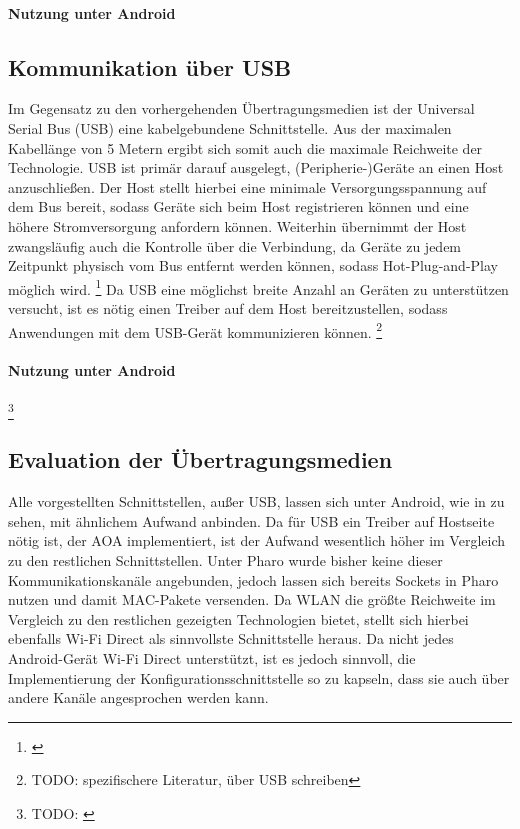         \paragraph{Nutzung unter Android}

    \subsection{Kommunikation über USB}
        Im Gegensatz zu den vorhergehenden Übertragungsmedien ist der Universal Serial Bus (USB) eine kabelgebundene Schnittstelle. Aus der maximalen Kabellänge von 5 Metern
        ergibt sich somit auch die maximale Reichweite der Technologie. USB ist primär darauf ausgelegt, (Peripherie-)Geräte an einen Host anzuschließen.
        Der Host stellt hierbei eine minimale Versorgungsspannung auf dem Bus bereit, sodass Geräte sich beim Host registrieren können und eine höhere Stromversorgung anfordern können.
        Weiterhin übernimmt der Host zwangsläufig auch die Kontrolle über die Verbindung, da Geräte zu jedem Zeitpunkt physisch vom Bus entfernt werden können, sodass Hot-Plug-and-Play
        möglich wird. \footnote{\cite[S.21-24]{Kelm}}
        Da USB eine möglichst breite Anzahl an Geräten zu unterstützen versucht, ist es nötig einen Treiber auf dem Host bereitzustellen, sodass Anwendungen mit dem USB-Gerät kommunizieren können.
        \footnote{TODO: \cite[S.197]{Kelm} spezifischere Literatur, über USB schreiben}

        \paragraph{Nutzung unter Android}
        \footnote{TODO: \cite{AOA}}

    \subsection{Evaluation der Übertragungsmedien}
    Alle vorgestellten Schnittstellen, außer USB, lassen sich unter Android, wie in \cite{test-repository} zu sehen, mit ähnlichem Aufwand anbinden.
    Da für USB ein Treiber auf Hostseite nötig ist, der AOA implementiert, ist der Aufwand wesentlich höher im Vergleich zu den restlichen Schnittstellen.
    Unter Pharo wurde bisher keine dieser Kommunikationskanäle angebunden,
    jedoch lassen sich bereits Sockets in Pharo nutzen und damit MAC-Pakete versenden.
    Da WLAN die größte Reichweite im Vergleich zu den restlichen gezeigten Technologien bietet, stellt sich hierbei ebenfalls Wi-Fi Direct als sinnvollste Schnittstelle heraus.
    Da nicht jedes Android-Gerät Wi-Fi Direct unterstützt, ist es jedoch sinnvoll, die Implementierung der Konfigurationsschnittstelle so zu kapseln,
    dass sie auch über andere Kanäle angesprochen werden kann.
    
